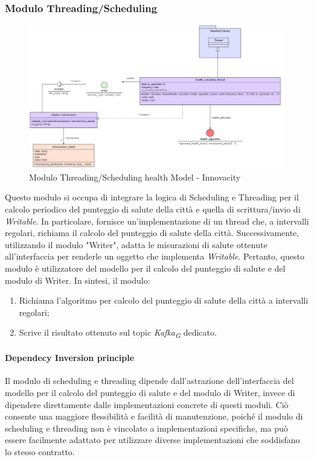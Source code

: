 \subsubsection{Modulo Threading/Scheduling}
\begin{figure}[H]
    \centering
    \includegraphics[width=1\textwidth]{../Images/SpecificaTecnica/healthThreading.PNG}
    \caption{Modulo Threading/Scheduling health Model - Innovacity}
    \label{fig: threadHealth}
\end{figure}

Questo modulo si occupa di integrare la logica di Scheduling e Threading per il calcolo periodico del punteggio di salute della città e quella di scrittura/invio di \textit{Writable}. In particolare, fornisce un'implementazione di un thread che, a intervalli regolari, richiama il calcolo del punteggio di salute della città. Successivamente, utilizzando il modulo "Writer", adatta le misurazioni di salute ottenute all'interfaccia per renderle un oggetto che implementa \textit{Writable}. Pertanto, questo modulo è utilizzatore del modello per il calcolo del punteggio di salute e del modulo di Writer.
In sintesi, il modulo:
    \begin{enumerate}
        \item Richiama l'algoritmo per calcolo del punteggio di salute della città a intervalli regolari;
        \item Scrive il risultato ottenuto sul topic \textit{Kafka}\textsubscript{\textit{G}} dedicato.
    \end{enumerate}

\paragraph*{Dependecy Inversion principle}
Il modulo di scheduling e threading dipende dall'astrazione dell'interfaccia del modello per il calcolo del punteggio di salute e del modulo di Writer, invece di dipendere direttamente dalle implementazioni concrete di questi moduli. Ciò consente una maggiore flessibilità e facilità di manutenzione, poiché il modulo di scheduling e threading non è vincolato a implementazioni specifiche, ma può essere facilmente adattato per utilizzare diverse implementazioni che soddisfano lo stesso contratto.

